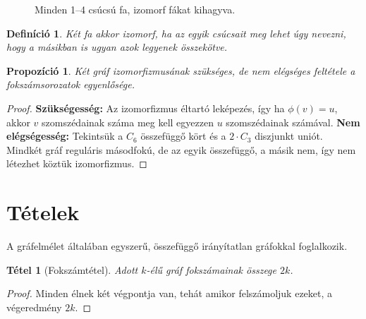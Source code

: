 \documentclass{article}
\newtheorem{definition}{Definíció}[section]
\newtheorem{theorem}{Tétel}[section]
\newtheorem{proposition}{Propozíció}[section]
\begin{document}
\begin{figure}[h]
\centering
{}

\caption{Minden 1--4 csúcsú fa, izomorf fákat kihagyva.}
\end{figure} %

\begin{definition}
    Két fa akkor izomorf, ha az egyik csúcsait meg lehet úgy nevezni, hogy a másikban is ugyan azok legyenek összekötve.
\end{definition}

\begin{proposition}
Két gráf izomorfizmusának szükséges, de nem elégséges feltétele a fokszámsorozatok egyenlősége.
\end{proposition}
\begin{proof}
\textbf{Szükségesség:} Az izomorfizmus éltartó leképezés, így ha $\phi(v) = u$, akkor $v$ szomszédainak száma meg kell egyezzen $u$ szomszédainak számával.\textbf{ Nem elégségesség:} Tekintsük a $C_6$ összefüggő kört és a $2 \cdot C_3$ diszjunkt uniót. Mindkét gráf reguláris másodfokú, de az egyik összefüggő, a másik nem, így nem létezhet köztük izomorfizmus.
\end{proof}

\section{Tételek}
A gráfelmélet általában egyszerű, összefüggő irányítatlan gráfokkal foglalkozik.
\begin{theorem}[Fokszámtétel]
    Adott $k$-élű gráf fokszámainak összege $2k$.
\end{theorem}
\begin{proof}
    Minden élnek két végpontja van, tehát amikor felszámoljuk ezeket, a végeredmény $2k$.
\end{proof}
\end{document}
